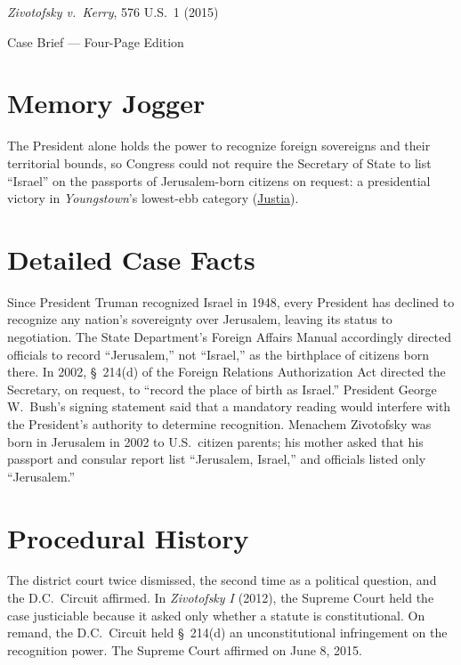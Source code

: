 \documentclass[12pt]{article}
\begin{document}
\begin{center}
{\LARGE \textit{Zivotofsky v.\ Kerry}, 576 U.S.\ 1 (2015)\par}
\vspace{0.8em}
{\large Case Brief --- Four-Page Edition\par}
\end{center}
\vspace{1em}

\section{Memory Jogger}

The President alone holds the power to recognize foreign sovereigns and their territorial bounds, so Congress could not require the Secretary of State to list ``Israel'' on the passports of Jerusalem-born citizens on request: a presidential victory in \textit{Youngstown}'s lowest-ebb category (\href{https://supreme.justia.com/cases/federal/us/576/1/}{Justia}).

\section{Detailed Case Facts}

Since President Truman recognized Israel in 1948, every President has declined to recognize any nation's sovereignty over Jerusalem, leaving its status to negotiation. The State Department's Foreign Affairs Manual accordingly directed officials to record ``Jerusalem,'' not ``Israel,'' as the birthplace of citizens born there. In 2002, \S~214(d) of the Foreign Relations Authorization Act directed the Secretary, on request, to ``record the place of birth as Israel.'' President George W.\ Bush's signing statement said that a mandatory reading would interfere with the President's authority to determine recognition. Menachem Zivotofsky was born in Jerusalem in 2002 to U.S.\ citizen parents; his mother asked that his passport and consular report list ``Jerusalem, Israel,'' and officials listed only ``Jerusalem.''

\section{Procedural History}

The district court twice dismissed, the second time as a political question, and the D.C.\ Circuit affirmed. In \textit{Zivotofsky I} (2012), the Supreme Court held the case justiciable because it asked only whether a statute is constitutional. On remand, the D.C.\ Circuit held \S~214(d) an unconstitutional infringement on the recognition power. The Supreme Court affirmed on June 8, 2015.
\end{document}
